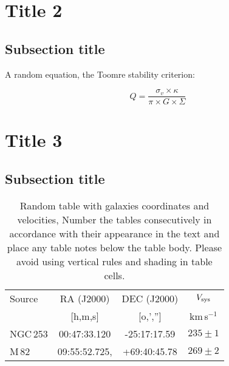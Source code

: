 \documentclass[final,5p,times,twocolumn]{elsarticle}
\newcommand{\kms}{km\,s$^{-1}$}
\begin{document}


\section{Title 2}
\lipsum[1]

\subsection{Subsection title}

A random equation, the Toomre stability criterion:

\begin{equation}
    Q = \frac{\sigma_v \times \kappa}{\pi \times G \times \Sigma}
\end{equation}

\section{Title 3}
\lipsum[2]

\subsection{Subsection title}
\lipsum[3]

\begin{table}
\begin{tabular}{l c c c} 
 \hline
 Source & RA (J2000) & DEC (J2000) & $V_{\rm sys}$ \\ 
        & [h,m,s]    & [o,','']    & \kms          \\
 \hline
 NGC\,253 & 	00:47:33.120 & -25:17:17.59 & $235 \pm 1$ \\ 
 M\,82 & 09:55:52.725, & +69:40:45.78 & $269 \pm 2$ 	 \\ 
 \hline
\end{tabular}
\caption{Random table with galaxies coordinates and velocities, Number the tables consecutively in
accordance with their appearance in the text and place any table notes below the table body. Please avoid using vertical rules and shading in table cells.
}
\label{Table1}
\end{table}
\end{document}
